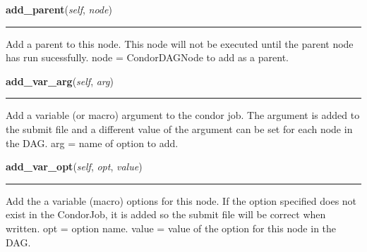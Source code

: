     \noindent\begin{boxedminipage}{\textwidth}

    \raggedright \textbf{add\_parent}(\textit{self}, \textit{node})

    \vspace{-1.5ex}

    \rule{\textwidth}{0.5\fboxrule}
    Add a parent to this node. This node will not be executed until the 
    parent node has run sucessfully. node = CondorDAGNode to add as a 
    parent.

    \vspace{1ex}

    \end{boxedminipage}

    \label{pipeline:CondorDAGNode:add_var_arg}
    \vspace{0.5ex}

    \noindent\begin{boxedminipage}{\textwidth}

    \raggedright \textbf{add\_var\_arg}(\textit{self}, \textit{arg})

    \vspace{-1.5ex}

    \rule{\textwidth}{0.5\fboxrule}
    Add a variable (or macro) argument to the condor job. The argument is 
    added to the submit file and a different value of the argument can be 
    set for each node in the DAG. arg = name of option to add.

    \vspace{1ex}

    \end{boxedminipage}

    \label{pipeline:CondorDAGNode:add_var_opt}
    \vspace{0.5ex}

    \noindent\begin{boxedminipage}{\textwidth}

    \raggedright \textbf{add\_var\_opt}(\textit{self}, \textit{opt}, \textit{value})

    \vspace{-1.5ex}

    \rule{\textwidth}{0.5\fboxrule}
    Add the a variable (macro) options for this node. If the option 
    specified does not exist in the CondorJob, it is added so the submit 
    file will be correct when written. opt = option name. value = value 
    of the option for this node in the DAG.

    \vspace{1ex}

    \end{boxedminipage}

